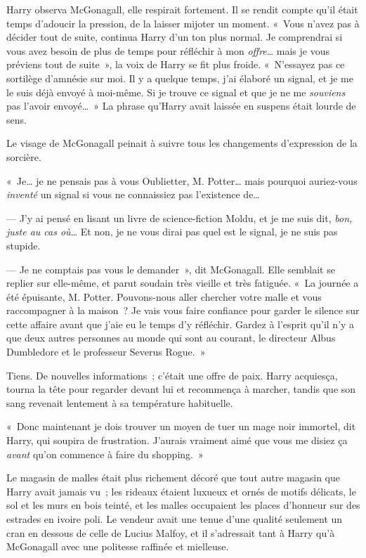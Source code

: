 Harry observa McGonagall, elle respirait fortement.
Il se rendit compte qu'il était temps d'adoucir la pression, de la laisser mijoter un moment.
«~Vous n'avez pas à décider tout de suite, continua Harry d'un ton plus normal.
Je comprendrai si vous avez besoin de plus de temps pour réfléchir à mon \emph{offre}… mais je vous préviens tout de suite~», la voix de Harry se fit plus froide.
«~N'essayez pas ce sortilège d'amnésie sur moi.
Il y a quelque temps, j'ai élaboré un signal, et je me le suis déjà envoyé à moi-même.
Si je trouve ce signal et que je ne me \emph{souviens} pas l'avoir envoyé…~»
La phrase qu'Harry avait laissée en suspens était lourde de sens.

Le visage de McGonagall peinait à suivre tous les changements d'expression de la sorcière.

«~Je… je ne pensais pas à vous Oublietter, M. Potter… mais pourquoi auriez-vous \emph{inventé} un signal si vous ne connaissiez pas l'existence de…

--- J'y ai pensé en lisant un livre de science-fiction Moldu, et je me suis dit, \emph{bon, juste au cas où}… Et non, je ne vous dirai pas quel est le signal, je ne suis pas stupide.

--- Je ne comptais pas vous le demander~», dit McGonagall. Elle semblait se replier sur elle-même, et parut soudain très vieille et très fatiguée.
«~La journée a été épuisante, M. Potter. Pouvons-nous aller chercher votre malle et vous raccompagner à la maison~?
Je vais vous faire confiance pour garder le silence sur cette affaire avant que j'aie eu le temps d'y réfléchir.
Gardez à l'esprit qu'il n'y a que deux autres personnes au monde qui sont au courant, le directeur Albus Dumbledore et le professeur Severus Rogue.~»

Tiens. De nouvelles informations~; c'était une offre de paix. Harry acquiesça, tourna la tête pour regarder devant lui et recommença à marcher, tandis que son sang revenait lentement à sa température habituelle.

«~Donc maintenant je dois trouver un moyen de tuer un mage noir immortel, dit Harry, qui soupira de frustration. J'aurais vraiment aimé que vous me disiez ça \emph{avant} qu'on commence à faire du shopping.~»

\later

Le magasin de malles était plus richement décoré que tout autre magasin que Harry avait jamais vu~;
les rideaux étaient luxueux et ornés de motifs délicats, le sol et les murs en bois teinté, et les malles occupaient les places d'honneur sur des estrades en ivoire poli.
Le vendeur avait une tenue d'une qualité seulement un cran en dessous de celle de Lucius Malfoy, et il s'adressait tant à Harry qu'à McGonagall avec une politesse raffinée et mielleuse.

